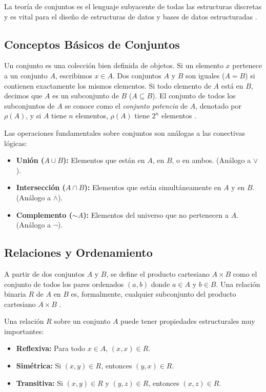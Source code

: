 \documentclass[12pt, letterpaper]{article}
\begin{document}
La teoría de conjuntos es el lenguaje subyacente de todas las estructuras discretas y es vital para el diseño de estructuras de datos y bases de datos estructuradas \cite{tremblay2000matematicas}.

\subsection{Conceptos Básicos de Conjuntos}
Un conjunto es una colección bien definida de objetos. Si un elemento $x$ pertenece a un conjunto $A$, escribimos $x \in A$. Dos conjuntos $A$ y $B$ son iguales ($A = B$) si contienen exactamente los mismos elementos. Si todo elemento de $A$ está en $B$, decimos que $A$ es un subconjunto de $B$ ($A \subseteq B$). El conjunto de todos los subconjuntos de $A$ se conoce como el \textit{conjunto potencia} de $A$, denotado por $\rho(A)$, y si $A$ tiene $n$ elementos, $\rho(A)$ tiene $2^n$ elementos \cite{tremblay2000matematicas}.

Las operaciones fundamentales sobre conjuntos son análogas a las conectivas lógicas:
\begin{itemize}
    \item \textbf{Unión ($A \cup B$):} Elementos que están en $A$, en $B$, o en ambos. (Análogo a $\vee$).
    \item \textbf{Intersección ($A \cap B$):} Elementos que están simultáneamente en $A$ y en $B$. (Análogo a $\wedge$).
    \item \textbf{Complemento ($\sim A$):} Elementos del universo que no pertenecen a $A$. (Análogo a $\neg$).
\end{itemize}

\subsection{Relaciones y Ordenamiento}
A partir de dos conjuntos $A$ y $B$, se define el producto cartesiano $A \times B$ como el conjunto de todos los pares ordenados $(a,b)$ donde $a \in A$ y $b \in B$. Una relación binaria $R$ de $A$ en $B$ es, formalmente, cualquier subconjunto del producto cartesiano $A \times B$ \cite{tremblay2000matematicas}.

Una relación $R$ sobre un conjunto $A$ puede tener propiedades estructurales muy importantes:
\begin{itemize}
    \item \textbf{Reflexiva:} Para todo $x \in A$, $(x,x) \in R$.
    \item \textbf{Simétrica:} Si $(x,y) \in R$, entonces $(y,x) \in R$.
    \item \textbf{Transitiva:} Si $(x,y) \in R$ y $(y,z) \in R$, entonces $(x,z) \in R$.
\end{itemize}
\end{document}
